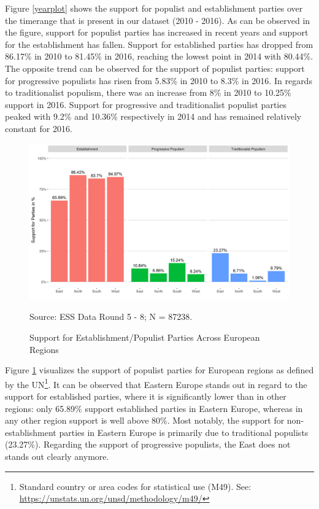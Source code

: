 \documentclass[]{article}
\let\rmarkdownfootnote\footnote%
\def\footnote{\protect\rmarkdownfootnote}
\begin{document}
Figure \ref{yearplot} shows the support for populist and establishment
parties over the timerange that is present in our dataset (2010 - 2016).
As can be observed in the figure, support for populist parties has
increased in recent years and support for the establishment has fallen.
Support for established parties has dropped from 86.17\% in 2010 to
81.45\% in 2016, reaching the lowest point in 2014 with 80.44\%. The
opposite trend can be observed for the support of populist parties:
support for progressive populists has risen from 5.83\% in 2010 to 8.3\%
in 2016. In regards to traditionalist populism, there was an increase
from 8\% in 2010 to 10.25\% support in 2016. Support for progressive and
traditionalist populist parties peaked with 9.2\% and 10.36\%
respectively in 2014 and has remained relatively constant for 2016.

\begin{figure}[]
    \caption{Support for Establishment/Populist Parties Across European Regions}
    \label{regionplot}
    \includegraphics[width=\textwidth]{images/regionalplot.png}
    \flushright
    {\scriptsize Source: ESS Data Round 5 - 8; N = 87238. \par}
\end{figure}

Figure \ref{regionplot} visualizes the support of populist parties for
European regions as defined by the UN\footnote{Standard country or area
  codes for statistical use (M49). See:
  \url{https://unstats.un.org/unsd/methodology/m49/}}. It can be
observed that Eastern Europe stands out in regard to the support for
established parties, where it is significantly lower than in other
regions: only 65.89\% support established parties in Eastern Europe,
whereas in any other region support is well above 80\%. Most notably,
the support for non-establishment parties in Eastern Europe is primarily
due to traditional populists (23.27\%). Regarding the support of
progressive populists, the East does not stands out clearly anymore.
\end{document}
